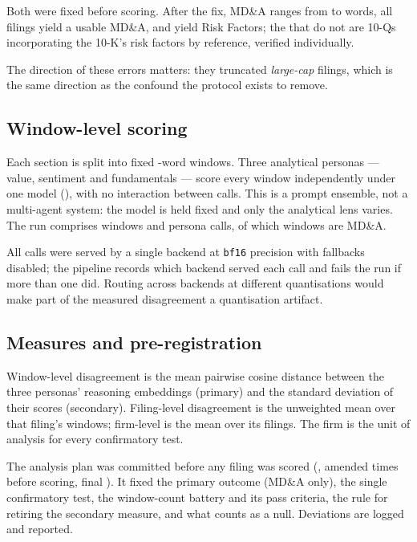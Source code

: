 \documentclass[sigconf,nonacm]{acmart}
\begin{document}
Both were fixed before scoring. After the fix, MD\&A ranges from \MdaWordsMin{}
to \MdaWordsMax{} words, all \NFilings{} filings yield a usable MD\&A, and
\NFilingsWithRisk{} yield Risk Factors; the \NFilingsNoRisk{} that do not are
10-Qs incorporating the 10-K's risk factors by reference, verified individually.

The direction of these errors matters: they truncated \emph{large-cap} filings,
which is the same direction as the confound the protocol exists to remove.

\subsection{Window-level scoring}

Each section is split into fixed \ChunkWords-word windows. Three analytical
personas --- value, sentiment and fundamentals --- score every window
independently under one model (\ModelName), with no interaction between calls.
This is a prompt ensemble, not a multi-agent system: the model is held fixed and
only the analytical lens varies. The run comprises \NWindows{} windows and
\NCalls{} persona calls, of which \NWindowsMDA{} windows are MD\&A.

All calls were served by a single backend at \texttt{bf16} precision with
fallbacks disabled; the pipeline records which backend served each call and fails
the run if more than one did. Routing across backends at different quantisations
would make part of the measured disagreement a quantisation artifact.

\subsection{Measures and pre-registration}

Window-level disagreement is the mean pairwise cosine distance between the three
personas' reasoning embeddings (primary) and the standard deviation of their
scores (secondary). Filing-level disagreement is the unweighted mean over that
filing's windows; firm-level is the mean over its filings. The firm is the unit
of analysis for every confirmatory test.

The analysis plan was committed before any filing was scored
(\texttt{\PlanHashFirst}, amended \PlanAmendments{} times before scoring, final
\texttt{\PlanHashUsed}). It fixed the primary outcome (MD\&A only), the single
confirmatory test, the window-count battery and its pass criteria, the rule for
retiring the secondary measure, and what counts as a null. Deviations are logged
and reported.
\end{document}
